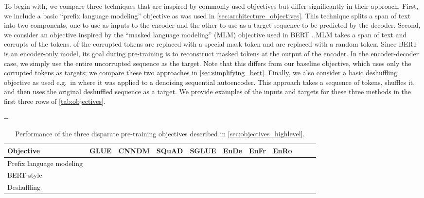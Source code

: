 \documentclass[twoside,11pt]{article}
\newlength{\offsetpage}
\newenvironment{widepage}{\begin{adjustwidth}{-\offsetpage}{-\offsetpage}\addtolength{\textwidth}{2\offsetpage}}{\end{adjustwidth}}
\begin{document}
To begin with, we compare three techniques that are inspired by commonly-used objectives but differ significantly in their approach.
First, we include a basic ``prefix language modeling'' objective as was used in \cref{sec:architecture_objectives}.
This technique splits a span of text into two components, one to use as inputs to the encoder and the other to use as a target sequence to be predicted by the decoder.
Second, we consider an objective inspired by the ``masked language modeling'' (MLM) objective used in BERT \citep{devlin2018bert}.
MLM takes a span of text and corrupts  of the tokens.
 of the corrupted tokens are replaced with a special mask token and  are replaced with a random token.
Since BERT is an encoder-only model, its goal during pre-training is to reconstruct masked tokens at the output of the encoder.
In the encoder-decoder case, we simply use the entire uncorrupted sequence as the target.
Note that this differs from our baseline objective, which uses only the corrupted tokens as targets; we compare these two approaches in \cref{sec:simplifying_bert}.
Finally, we also consider a basic deshuffling objective as used e.g.\ in \citep{liu2019summae} where it was applied to a denoising sequential autoencoder.
This approach takes a sequence of tokens, shuffles it, and then uses the original deshuffled sequence as a target.
We provide examples of the inputs and targets for these three methods in the first three rows of \cref{tab:objectives}.

\begin{table}
\footnotesize
\begin{widepage}
\centering
\begin{tabular}{l c c c c c c c c c c}
\toprule
    Objective                         & GLUE        & CNNDM       & SQuAD       & SGLUE       & EnDe        & EnFr        & EnRo        \\
\midrule
    Prefix language modeling          &      &      &      &      &  &      &  \\
    BERT-style \citep{devlin2018bert} &  &  &  &  &  &  &  \\
    Deshuffling                       &      &      &      &      &      &      &  \\
\bottomrule
\end{tabular}
\end{widepage}
\caption{
Performance of the three disparate pre-training objectives described in \cref{sec:objectives_highlevel}.
}
\label{tab:objectives_highlevel}
\end{table}
\end{document}
